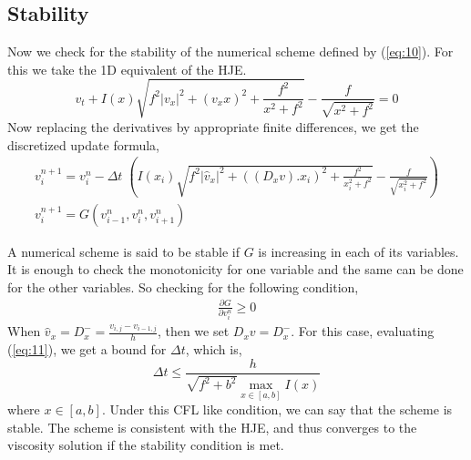 \documentclass[11pt]{report}
\begin{document}
	\subsection{Stability}
	Now we check for the stability of the numerical scheme defined by (\ref{eq:10}). For this we take the 1D equivalent of the HJE.
	\begin{equation}
		v_t + I(x)\sqrt{f^2|v_x|^2 + (v_x x)^2 + \frac{f^2}{x^2+f^2}} - \frac{f}{\sqrt{x^2+f^2}} = 0
	\end{equation}
	\noindent
	Now replacing the derivatives by appropriate finite differences, we get the discretized update formula,
	\begin{gather}
		v_i^{n+1} = v_i^n - \Delta t \;  \left(I(x_i)\sqrt{f^2|\hat{v}_x|^2 + ((D_xv). x_i)^2 + \frac{f^2}{x_i^2+f^2}} - \frac{f}{\sqrt{x_i^2+f^2}}\right)\\
		v_i^{n+1} = G(v_{i-1}^n, v_i^n, v_{i+1}^n)
	\end{gather}
	
	\noindent
	A numerical scheme is said to be stable if $G$ is increasing in each of its variables. It is enough to check the monotonicity for one variable and the same can be done for the other variables. So checking for the following condition,
	\begin{eqnarray}
		\frac{\partial G}{\partial v_i^n} \ge 0 \label{eq:11}
	\end{eqnarray}
	When $\hat{v}_x = D^-_x = \frac{v_{i,j}-v_{i-1,j}}{h}$, then we set $D_x v = D^-_x$. For this case, evaluating (\ref{eq:11}), we get a bound for $\Delta t$, which is,
	\begin{equation}
		\Delta t \le \frac{h}{\sqrt{f^2+b^2}\underset{x\in [a,b]}{\max} I(x)}
	\end{equation}
	where $x \in [a,b]$. Under this CFL like condition, we can say that the scheme is stable. The scheme is consistent with the HJE, and thus converges to the viscosity solution if the stability condition is met.
	
\end{document}
